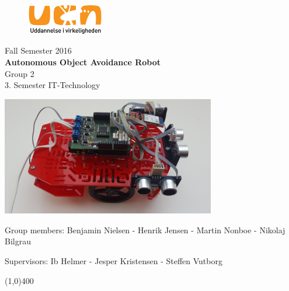 \clearpage
\thispagestyle{empty}

\begin{figure}[H]
	\raggedleft
		\includegraphics[width=0.3\textwidth]{figures/logo-ucn.png}
\end{figure}
\vspace*{\fill} 
\begin{center}
\begin{Huge}
Fall Semester 2016\\
\vspace{5 mm}
\textbf{Autonomous Object Avoidance Robot}\\
\vspace{3 mm}
Group 2\\
\vspace{3 mm}
3. Semester IT-Technology
\end{Huge}
\includegraphics[width=0.7\textwidth]{figures/frontPageBot.png}
\end{center}
\vspace*{\fill}
\begin{center}
Group members:
 Benjamin Nielsen - Henrik Jensen - Martin Nonboe - Nikolaj Bilgrau
\end{center}
\begin{center}
Supervisors: Ib Helmer - Jesper Kristensen - Steffen Vutborg
\end{center}
\begin{center}
\line(1,0){400}
\end{center}